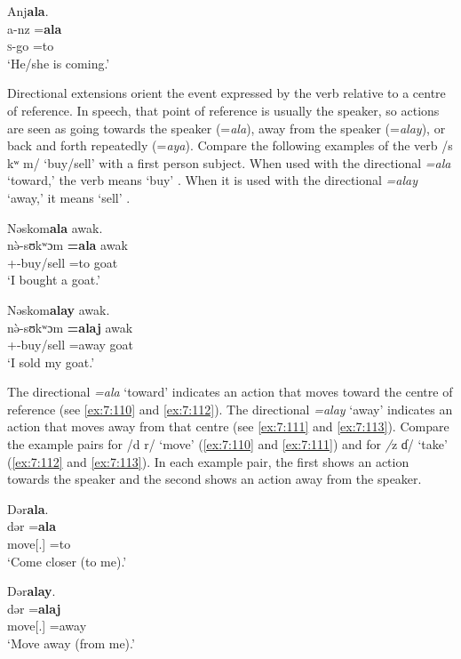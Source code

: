 \ea\label{ex:7:107}
Anj\textbf{ala}.\\
\gll a-nz =\textbf{ala}\\
\textsc{s}-go   =to\\
\glt ‘He/she is coming.’  
\z

Directional extensions orient the event expressed by the verb relative to a centre of reference.  In speech, that point of reference is usually the speaker, so actions are seen as going towards the speaker (=\textit{ala}), away from the speaker (=\textit{alay}), or back and forth repeatedly (=\textit{aya}). Compare the following examples of the verb /s kʷ m/ ‘buy/sell’ with a first person subject. When used with the directional \textit{=ala} ‘toward,’ the verb means ‘buy’ . When it is used with the directional \textit{=alay} ‘away,’ it means ‘sell’ .

\ea\label{ex:7:108}
Nəskom\textbf{ala}  awak.\\
\gll  n\`ə-sʊkʷɔm \textbf{=ala}    awak\\
      {\oneS}+{\PFV}-buy/sell =to    goat\\
\glt  ‘I bought a goat.’\\
\z 

\ea\label{ex:7:109}
Nəskom\textbf{alay}  awak.\\
\gll  n\`ə-sʊkʷɔm    \textbf{=alaj}  awak\\
      {\oneS}+{\PFV}-buy/sell  =away  goat\\
\glt  ‘I sold my goat.’\\
\z 

The directional \textit{=ala} ‘toward’ indicates an action that moves toward the centre of reference (see \ref{ex:7:110} and \ref{ex:7:112}). The directional \textit{=alay} ‘away’ indicates an action that moves away from that centre (see \ref{ex:7:111} and \ref{ex:7:113}). Compare the example pairs for /d r/ ‘move’ (\ref{ex:7:110} and \ref{ex:7:111}) and for \textit{/}z ɗ/ ‘take’ (\ref{ex:7:112} and \ref{ex:7:113}). In each example pair, the first shows an action towards the speaker and the second shows an action away from the speaker. 

\ea\label{ex:7:110}
Dər\textbf{ala}. \\
\gll  dər      =\textbf{ala}\\
      move[{\twoS}.{\IMP}]   =to\\
\glt  ‘Come closer (to me).’\\
\z 

\ea\label{ex:7:111}
Dər\textbf{alay}.\\
\gll  dər      =\textbf{alaj}\\
      move[{\twoS}.{\IMP}]   =away\\
\glt  ‘Move away (from me).’\\
\z 

